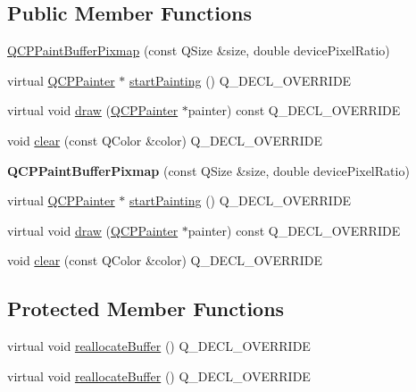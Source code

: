 \subsection*{Public Member Functions}
\begin{DoxyCompactItemize}
\item 
\hyperlink{class_q_c_p_paint_buffer_pixmap_aef0224e03b9285509391fcd61a8e6844}{Q\+C\+P\+Paint\+Buffer\+Pixmap} (const Q\+Size \&size, double device\+Pixel\+Ratio)
\item 
virtual \hyperlink{class_q_c_p_painter}{Q\+C\+P\+Painter} $\ast$ \hyperlink{class_q_c_p_paint_buffer_pixmap_a357964ef7d28cfa530338be4e5c93234}{start\+Painting} () Q\+\_\+\+D\+E\+C\+L\+\_\+\+O\+V\+E\+R\+R\+I\+DE
\item 
virtual void \hyperlink{class_q_c_p_paint_buffer_pixmap_af7bfc685e56a0a9329e57cd9a265eb74}{draw} (\hyperlink{class_q_c_p_painter}{Q\+C\+P\+Painter} $\ast$painter) const Q\+\_\+\+D\+E\+C\+L\+\_\+\+O\+V\+E\+R\+R\+I\+DE
\item 
void \hyperlink{class_q_c_p_paint_buffer_pixmap_a14badbd010a3cde6b55817ccb7b65217}{clear} (const Q\+Color \&color) Q\+\_\+\+D\+E\+C\+L\+\_\+\+O\+V\+E\+R\+R\+I\+DE
\item 
\mbox{\label{class_q_c_p_paint_buffer_pixmap_aef0224e03b9285509391fcd61a8e6844}} 
{\bfseries Q\+C\+P\+Paint\+Buffer\+Pixmap} (const Q\+Size \&size, double device\+Pixel\+Ratio)
\item 
virtual \hyperlink{class_q_c_p_painter}{Q\+C\+P\+Painter} $\ast$ \hyperlink{class_q_c_p_paint_buffer_pixmap_a0b919d080c2551ee35aedccebde0a67d}{start\+Painting} () Q\+\_\+\+D\+E\+C\+L\+\_\+\+O\+V\+E\+R\+R\+I\+DE
\item 
virtual void \hyperlink{class_q_c_p_paint_buffer_pixmap_a7f8df231d2439e6b9953b86798815600}{draw} (\hyperlink{class_q_c_p_painter}{Q\+C\+P\+Painter} $\ast$painter) const Q\+\_\+\+D\+E\+C\+L\+\_\+\+O\+V\+E\+R\+R\+I\+DE
\item 
void \hyperlink{class_q_c_p_paint_buffer_pixmap_a14badbd010a3cde6b55817ccb7b65217}{clear} (const Q\+Color \&color) Q\+\_\+\+D\+E\+C\+L\+\_\+\+O\+V\+E\+R\+R\+I\+DE
\end{DoxyCompactItemize}
\subsection*{Protected Member Functions}
\begin{DoxyCompactItemize}
\item 
virtual void \hyperlink{class_q_c_p_paint_buffer_pixmap_ad49f3205ba3463b1c44f8db3cfcc90f0}{reallocate\+Buffer} () Q\+\_\+\+D\+E\+C\+L\+\_\+\+O\+V\+E\+R\+R\+I\+DE
\item 
virtual void \hyperlink{class_q_c_p_paint_buffer_pixmap_a055692ff7293153ed5c589f3d7a6718e}{reallocate\+Buffer} () Q\+\_\+\+D\+E\+C\+L\+\_\+\+O\+V\+E\+R\+R\+I\+DE
\end{DoxyCompactItemize}
